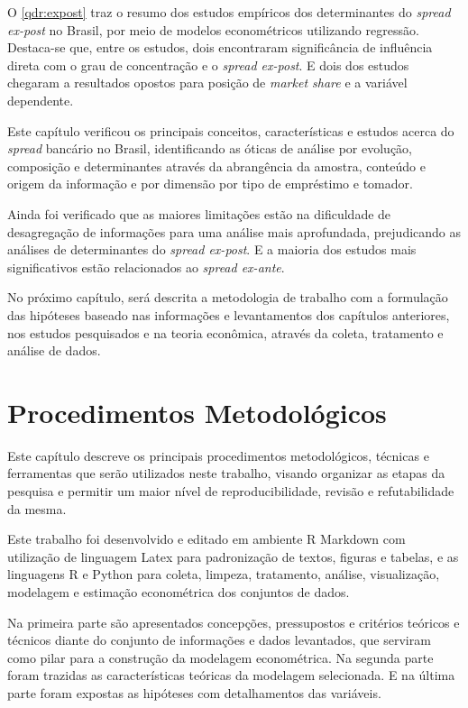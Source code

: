 \documentclass[
  12pt,
  12pt,
  openright,
  oneside,
  a4paper,
  chapter=TITLE,
  section=TITLE,
  subsection=TITLE,
  subsubsection=TITLE,
  portugues,
  sumario=tradicional]{abntex2}
\begin{document}
O \autoref{qdr:expost} traz o resumo dos estudos empíricos dos determinantes do \emph{spread ex-post} no Brasil, por meio de modelos econométricos utilizando regressão. Destaca-se que, entre os estudos, dois encontraram significância de influência direta com o grau de concentração e o \emph{spread ex-post}. E dois dos estudos chegaram a resultados opostos para posição de \emph{market share} e a variável dependente.

Este capítulo verificou os principais conceitos, características e estudos acerca do \emph{spread} bancário no Brasil, identificando as óticas de análise por evolução, composição e determinantes através da abrangência da amostra, conteúdo e origem da informação e por dimensão por tipo de empréstimo e tomador.

Ainda foi verificado que as maiores limitações estão na dificuldade de desagregação de informações para uma análise mais aprofundada, prejudicando as análises de determinantes do \emph{spread ex-post}. E a maioria dos estudos mais significativos estão relacionados ao \emph{spread ex-ante}.

No próximo capítulo, será descrita a metodologia de trabalho com a formulação das hipóteses baseado nas informações e levantamentos dos capítulos anteriores, nos estudos pesquisados e na teoria econômica, através da coleta, tratamento e análise de dados.

\textual
\pagestyle{simple}
\parindent 1.50cm

\chapter{Procedimentos Metodológicos}

Este capítulo descreve os principais procedimentos metodológicos, técnicas e ferramentas que serão utilizados neste trabalho, visando organizar as etapas da pesquisa e permitir um maior nível de reproducibilidade, revisão e refutabilidade da mesma.

Este trabalho foi desenvolvido e editado em ambiente R Markdown com utilização de linguagem Latex para padronização de textos, figuras e tabelas, e as linguagens R e Python para coleta, limpeza, tratamento, análise, visualização, modelagem e estimação econométrica dos conjuntos de dados.

Na primeira parte são apresentados concepções, pressupostos e critérios teóricos e técnicos diante do conjunto de informações e dados levantados, que serviram como pilar para a construção da modelagem econométrica. Na segunda parte foram trazidas as características teóricas da modelagem selecionada. E na última parte foram expostas as hipóteses com detalhamentos das variáveis.
\end{document}
